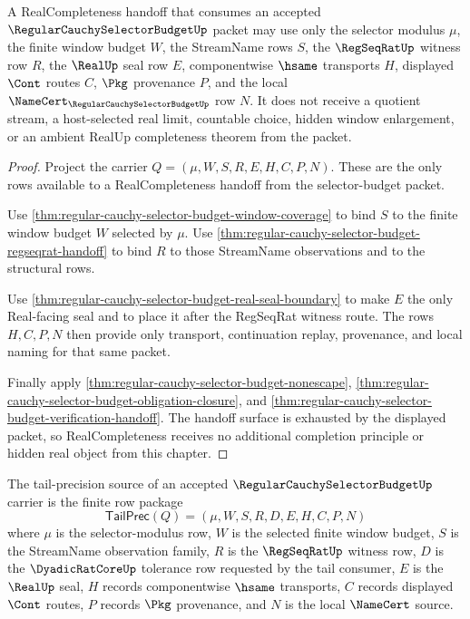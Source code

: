 \begin{theorem}
\label{thm:regular-cauchy-selector-budget-real-completeness-handoff}
A RealCompleteness handoff that consumes an accepted $\RegularCauchySelectorBudgetUp$ packet may use only the selector modulus $\mu$, the finite window budget $W$, the StreamName rows $S$, the $\RegSeqRatUp$ witness row $R$, the $\RealUp$ seal row $E$, componentwise $\hsame$ transports $H$, displayed $\Cont$ routes $C$, $\Pkg$ provenance $P$, and the local $\NameCert_{\RegularCauchySelectorBudgetUp}$ row $N$. It does not receive a quotient stream, a host-selected real limit, countable choice, hidden window enlargement, or an ambient RealUp completeness theorem from the packet.
\end{theorem}
\begin{proof}
Project the carrier $Q=(\mu,W,S,R,E,H,C,P,N)$. These are the only rows available to a RealCompleteness handoff from the selector-budget packet.

Use \autoref{thm:regular-cauchy-selector-budget-window-coverage} to bind $S$ to the finite window budget $W$ selected by $\mu$. Use \autoref{thm:regular-cauchy-selector-budget-regseqrat-handoff} to bind $R$ to those StreamName observations and to the structural rows.

Use \autoref{thm:regular-cauchy-selector-budget-real-seal-boundary} to make $E$ the only Real-facing seal and to place it after the RegSeqRat witness route. The rows $H,C,P,N$ then provide only transport, continuation replay, provenance, and local naming for that same packet.

Finally apply \autoref{thm:regular-cauchy-selector-budget-nonescape}, \autoref{thm:regular-cauchy-selector-budget-obligation-closure}, and \autoref{thm:regular-cauchy-selector-budget-verification-handoff}. The handoff surface is exhausted by the displayed packet, so RealCompleteness receives no additional completion principle or hidden real object from this chapter.
\end{proof}

\begin{definition}
\label{def:regular-cauchy-selector-budget-tail-precision-source}
The tail-precision source of an accepted $\RegularCauchySelectorBudgetUp$ carrier is the finite row package
$$
\mathsf{TailPrec}(Q)=(\mu,W,S,R,D,E,H,C,P,N)
$$
where $\mu$ is the selector-modulus row, $W$ is the selected finite window budget, $S$ is the StreamName observation family, $R$ is the $\RegSeqRatUp$ witness row, $D$ is the $\DyadicRatCoreUp$ tolerance row requested by the tail consumer, $E$ is the $\RealUp$ seal, $H$ records componentwise $\hsame$ transports, $C$ records displayed $\Cont$ routes, $P$ records $\Pkg$ provenance, and $N$ is the local $\NameCert$ source.
\end{definition}

